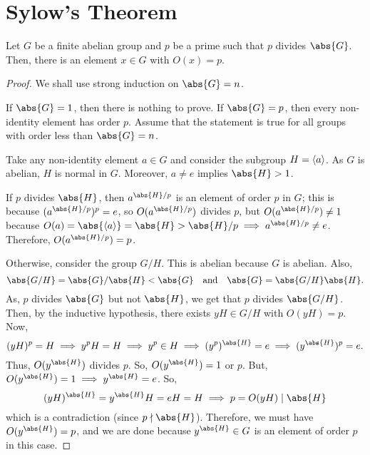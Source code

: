 \documentclass[11pt]{penrose}
\begin{document}

\section{Sylow's Theorem}
\begin{nthm}[Cauchy]
    Let $G$ be a finite abelian group and $p$ be a prime such that $p$ divides $\abs{G}$. Then, there is an element $x \in G$ with $O(x) = p$.
\end{nthm}
\begin{proof}
    We shall use strong induction on $\abs{G} = n$.

    If $\abs{G} = 1$, then there is nothing to prove. If $\abs{G} = p$, then every non-identity element has order $p$. Assume that the statement is true for all groups with order less than $\abs{G} = n$.

    Take any non-identity element $a \in G$ and consider the subgroup $H = \langle a\rangle$. As $G$ is abelian, $H$ is normal in $G$. Moreover, $a \neq e$ implies $\abs{H} > 1$.

    If $p$ divides $\abs{H}$, then $a^{\abs{H}/p}$ is an element of order $p$ in $G$; this is because $(a^{\abs{H}/p})^{p} = e$, so $O(a^{\abs{H}/p})$ divides $p$, but $O(a^{\abs{H}/p}) \neq 1$ because $O(a) = \abs{\cyclic{a}} = \abs{H} > \abs{H}/p \implies a^{\abs{H}/p} \neq e$. Therefore, $O(a^{\abs{H}/p}) = p$.

    Otherwise, consider the group $G/H$. This is abelian because $G$ is abelian. Also,
    \begin{equation*}
        \abs{G/H} = \abs{G} / \abs{H} < \abs{G}
        \quad\text{and}\quad
        \abs{G} = \abs{G/H} \abs{H}.
    \end{equation*}
    As, $p$ divides $\abs{G}$ but not $\abs{H}$, we get that $p$ divides $\abs{G/H}$. Then, by the inductive hypothesis, there exists $yH \in G/H$ with $O(yH) = p$. Now,
    \begin{equation*}
        (yH)^{p} = H
        \implies
        y^{p} H = H
        \implies
        y^{p} \in H
        \implies
        (y^{p})^{\abs{H}} = e
        \implies
        (y^{\abs{H}})^{p} = e.
    \end{equation*}
    Thus, $O(y^{\abs{H}})$ divides $p$. So, $O(y^{\abs{H}}) = 1$ or $p$. But, $O(y^{\abs{H}}) = 1 \implies y^{\abs{H}} = e$. So,
    \begin{equation*}
        (yH)^{\abs{H}} = y^{\abs{H}}H = eH = H
        \implies
        p = O(yH) \mid \abs{H}
    \end{equation*}
    which is a contradiction (since $p \nmid \abs{H}$). Therefore, we must have $O(y^{\abs{H}}) = p$, and we are done because $y^{\abs{H}} \in G$ is an element of order $p$ in this case.
\end{proof}
\end{document}

